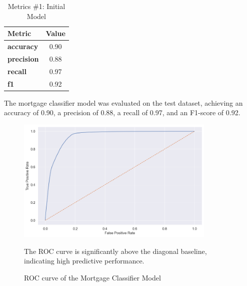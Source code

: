 \begin{table}[!htbp]
    \centering
    \begin{tabular}{l c}
    \toprule
    \textbf{Metric} & \textbf{Value} \\
    \midrule
    \textbf{accuracy} & 0.90 \\
    \textbf{precision} & 0.88 \\
    \textbf{recall} & 0.97 \\
    \textbf{f1} & 0.92 \\
    \bottomrule
    \end{tabular}
    \caption{Metrics \#1: Initial Model}
    \small
    The mortgage classifier model was evaluated on the test dataset, achieving an accuracy of 0.90, a precision of 0.88, a recall of 0.97, and an F1-score of 0.92.
    \label{tab:Model_Evaluation}
\end{table}

\begin{figure}
    \centering
    \includegraphics[width=0.85\textwidth]{images/Model_Training/Initial_ROC_curve.png}
    \caption{ROC curve of the Mortgage Classifier Model}
    \medskip
    \small
    The ROC curve is significantly above the diagonal baseline, indicating high predictive performance.
    \label{fig:Model_Training_ROC}
\end{figure}

